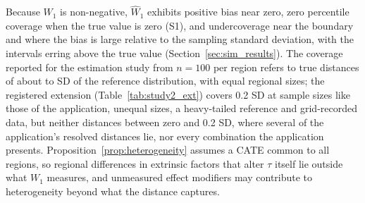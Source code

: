 \documentclass[AMA,Times1COL]{WileyNJDv5}
\begin{document}
Because $W_1$ is non-negative, $\widehat{W}_1$ exhibits positive bias near zero, zero percentile coverage when the true value is zero (S1), and undercoverage near the boundary and where the bias is large relative to the sampling standard deviation, with the intervals erring above the true value (Section~\ref{sec:sim_results}).\cite{andrews2000} The coverage reported for the estimation study from $n = 100$ per region refers to true distances of about  to  SD of the reference distribution, with equal regional sizes; the registered extension (Table~\ref{tab:study2_ext}) covers 0.2 SD at sample sizes like those of the application, unequal sizes, a heavy-tailed reference and grid-recorded data, but neither distances between zero and 0.2 SD, where several of the application's resolved distances lie, nor every combination the application presents. Proposition~\ref{prop:heterogeneity} assumes a CATE common to all regions, so regional differences in extrinsic factors that alter $\tau$ itself lie outside what $W_1$ measures, and unmeasured effect modifiers may contribute to heterogeneity beyond what the distance captures.
\end{document}
